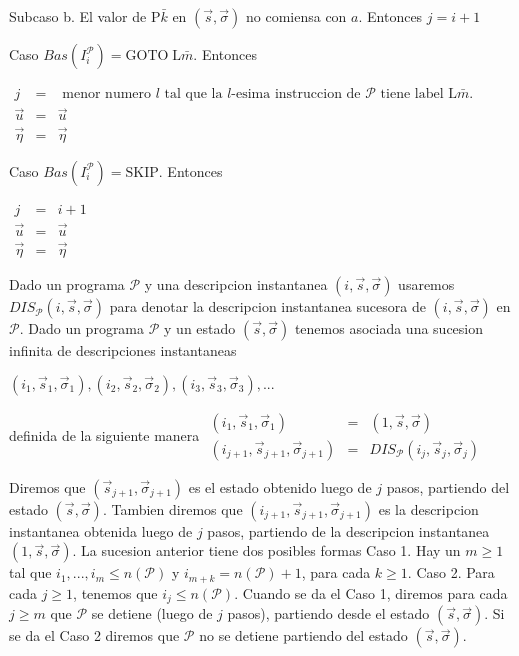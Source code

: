 Subcaso b. El valor de \(\mathrm{P}\bar{k}\) en \((\vec{s},\vec{\sigma})\) no comiensa con \(a\). Entonces \(j=i+1\)

Caso \(Bas(I_{i}^{\mathcal{P}})=\mathrm{GOTO}\;\mathrm{L}\bar{m}\). Entonces

\(\displaystyle \begin{array}{rcl} j & =& \text{ menor numero }l\text{ tal que la }l\text{-esima instruccion de } \mathcal{P}\text{ tiene label }\mathrm{L}\bar{m}. \\ \vec{u} & =& \vec{u} \\ \vec{\eta} & =& \vec{\eta} \end{array} \)

Caso \(Bas(I_{i}^{\mathcal{P}})=\mathrm{SKIP}\). Entonces

\(\displaystyle \begin{array}{rcl} j & =& i+1 \\ \vec{u} & =& \vec{u} \\ \vec{\eta} & =& \vec{\eta} \end{array} \)

Dado un programa \(\mathcal{P}\) y una descripcion instantanea \((i,\vec{s}, \vec{\sigma})\) usaremos \(DIS_{\mathcal{P}}(i,\vec{s},\vec{\sigma})\) para denotar la descripcion instantanea sucesora de \((i,\vec{s},\vec{\sigma})\) en \(\mathcal{P}\). Dado un programa \(\mathcal{P}\) y un estado \((\vec{s},\vec{ \sigma})\) tenemos asociada una sucesion infinita de descripciones instantaneas

\(\displaystyle (i_{1},\vec{s}_{1},\vec{\sigma}_{1}),(i_{2},\vec{s}_{2},\vec{\sigma} _{2}),(i_{3},\vec{s}_{3},\vec{\sigma}_{3}),... \)

definida de la siguiente manera
\(\displaystyle \begin{array}{rcl} (i_{1},\vec{s}_{1},\vec{\sigma}_{1}) & =& (1,\vec{s},\vec{\sigma}) \\ (i_{j+1},\vec{s}_{j+1},\vec{\sigma}_{j+1}) & =& DIS_{\mathcal{P}}(i_{j},\vec{s} _{j},\vec{\sigma}_{j}) \end{array} \)

Diremos que \((\vec{s}_{j+1},\vec{\sigma}_{j+1})\) es el estado obtenido luego de \(j\) pasos, partiendo del estado \((\vec{s},\vec{ \sigma})\). Tambien diremos que \((i_{j+1},\vec{s}_{j+1},\vec{\sigma}_{j+1})\) es la descripcion instantanea obtenida luego de \(j\) pasos, partiendo de la descripcion instantanea \((1,\vec{s},\vec{\sigma})\). La sucesion anterior tiene dos posibles formas
Caso 1. Hay un \(m\geq 1\) tal que \(i_{1},...,i_{m}\leq n(\mathcal{P} ) \) y \(i_{m+k}=n(\mathcal{P})+1\), para cada \(k\geq 1.\)
Caso 2. Para cada \(j\geq 1\), tenemos que \(i_{j}\leq n(\mathcal{P}).\)
Cuando se da el Caso 1, diremos para cada \(j\geq m\) que \(\mathcal{P }\) se detiene (luego de \(j\) pasos), partiendo desde el estado \((\vec{s},\vec{\sigma})\). Si se da el Caso 2 diremos que \(\mathcal{P} \) no se detiene partiendo del estado \((\vec{s},\vec{\sigma})\).




